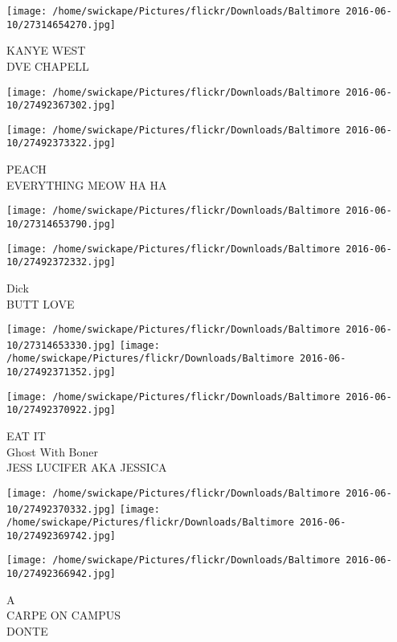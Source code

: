 \documentclass[10pt,letterpaper]{article}
\begin{document}
\vspace{0.25in}
\texttt{[image: /home/swickape/Pictures/flickr/Downloads/Baltimore 2016-06-10/27314654270.jpg]}

KANYE WEST\\
DVE CHAPELL
\pagebreak

\texttt{[image: /home/swickape/Pictures/flickr/Downloads/Baltimore 2016-06-10/27492367302.jpg]}

\vspace{0.25in}
\texttt{[image: /home/swickape/Pictures/flickr/Downloads/Baltimore 2016-06-10/27492373322.jpg]}

PEACH\\
EVERYTHING MEOW HA HA
\pagebreak

\texttt{[image: /home/swickape/Pictures/flickr/Downloads/Baltimore 2016-06-10/27314653790.jpg]}

\vspace{0.25in}
\texttt{[image: /home/swickape/Pictures/flickr/Downloads/Baltimore 2016-06-10/27492372332.jpg]}

Dick\\
BUTT LOVE
\pagebreak

\texttt{[image: /home/swickape/Pictures/flickr/Downloads/Baltimore 2016-06-10/27314653330.jpg]}
\texttt{[image: /home/swickape/Pictures/flickr/Downloads/Baltimore 2016-06-10/27492371352.jpg]}

\vspace{0.25in}
\texttt{[image: /home/swickape/Pictures/flickr/Downloads/Baltimore 2016-06-10/27492370922.jpg]}

EAT IT\\
Ghost With Boner\\
JESS LUCIFER AKA JESSICA
\pagebreak

\texttt{[image: /home/swickape/Pictures/flickr/Downloads/Baltimore 2016-06-10/27492370332.jpg]}
\texttt{[image: /home/swickape/Pictures/flickr/Downloads/Baltimore 2016-06-10/27492369742.jpg]}

\texttt{[image: /home/swickape/Pictures/flickr/Downloads/Baltimore 2016-06-10/27492366942.jpg]}

A\\
CARPE ON CAMPUS\\
DONTE
\pagebreak
\end{document}
